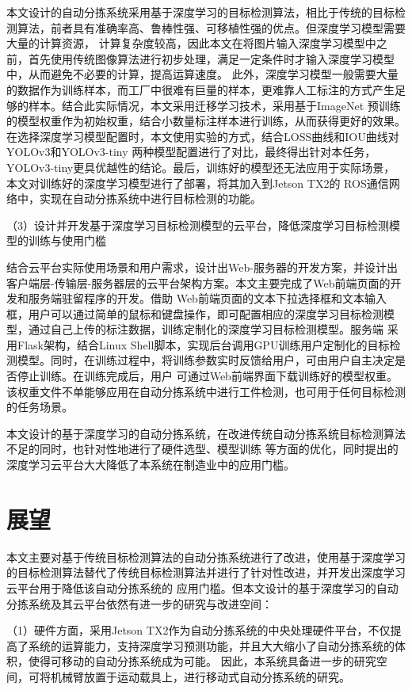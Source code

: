本文设计的自动分拣系统采用基于深度学习的目标检测算法，相比于传统的目标检测算法，前者具有准确率高、鲁棒性强、可移植性强的优点。但深度学习模型需要大量的计算资源，
计算复杂度较高，因此本文在将图片输入深度学习模型中之前，首先使用传统图像算法进行初步处理，满足一定条件时才输入深度学习模型中，从而避免不必要的计算，提高运算速度。
此外，深度学习模型一般需要大量的数据作为训练样本，而工厂中很难有巨量的样本，更难靠人工标注的方式产生足够的样本。结合此实际情况，本文采用迁移学习技术，采用基于ImageNet
预训练的模型权重作为初始权重，结合小数量标注样本进行训练，从而获得更好的效果。在选择深度学习模型配置时，本文使用实验的方式，结合LOSS曲线和IOU曲线对YOLOv3和YOLOv3-tiny
两种模型配置进行了对比，最终得出针对本任务，YOLOv3-tiny更具优越性的结论。最后，训练好的模型还无法应用于实际场景，本文对训练好的深度学习模型进行了部署，将其加入到Jetson TX2的
ROS通信网络中，实现在自动分拣系统中进行目标检测的功能。

（3）设计并开发基于深度学习目标检测模型的云平台，降低深度学习目标检测模型的训练与使用门槛

结合云平台实际使用场景和用户需求，设计出Web-服务器的开发方案，并设计出客户端层-传输层-服务器层的云平台架构方案。本文主要完成了Web前端页面的开发和服务端驻留程序的开发。借助
Web前端页面的文本下拉选择框和文本输入框，用户可以通过简单的鼠标和键盘操作，即可配置相应的深度学习目标检测模型，通过自己上传的标注数据，训练定制化的深度学习目标检测模型。服务端
采用Flask架构，结合Linux Shell脚本，实现后台调用GPU训练用户定制化的目标检测模型。同时，在训练过程中，将训练参数实时反馈给用户，可由用户自主决定是否停止训练。在训练完成后，用户
可通过Web前端界面下载训练好的模型权重。该权重文件不单能够应用在自动分拣系统中进行工件检测，也可用于任何目标检测的任务场景。

本文设计的基于深度学习的自动分拣系统，在改进传统自动分拣系统目标检测算法不足的同时，也针对性地进行了硬件选型、模型训练
等方面的优化，同时提出的深度学习云平台大大降低了本系统在制造业中的应用门槛。


\section{展望}

本文主要对基于传统目标检测算法的自动分拣系统进行了改进，使用基于深度学习的目标检测算法替代了传统目标检测算法并进行了针对性改进，并开发出深度学习云平台用于降低该自动分拣系统的
应用门槛。但本文设计的基于深度学习的自动分拣系统及其云平台依然有进一步的研究与改进空间：

（1）硬件方面，采用Jetson TX2作为自动分拣系统的中央处理硬件平台，不仅提高了系统的运算能力，支持深度学习预测功能，并且大大缩小了自动分拣系统的体积，使得可移动的自动分拣系统成为可能。
因此，本系统具备进一步的研究空间，可将机械臂放置于运动载具上，进行移动式自动分拣系统的研究。

